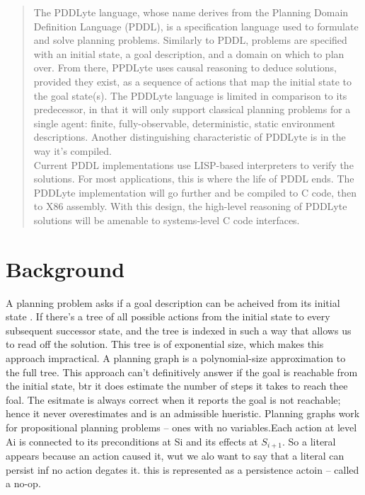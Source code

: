 \documentclass[
a4paper, %
11pt, %
onecolumn, %
openany, %
]{memoir}
\begin{document}
\begin{abstract}
The PDDLyte language, whose name derives from the Planning Domain Definition Language (PDDL)\cite{pddl98}, is a specification language used to formulate and solve planning problems. Similarly to PDDL, problems are specified with an initial state, a goal description, and a domain on which to plan over. From there, PPDLyte uses causal reasoning to deduce solutions, provided they exist, as a sequence of actions that map the initial state to the goal state(s). The PDDLyte language is limited in comparison to its predecessor, in that it will only support classical planning problems for a single agent: finite, fully-observable, deterministic, static environment descriptions. Another distinguishing characteristic of PDDLyte is in the way it's compiled.\\

Current PDDL implementations use LISP-based interpreters to verify the solutions. For most applications, this is where the life of PDDL ends. The PDDLyte implementation will go further and be compiled to C code, then to X86 assembly. With this design, the high-level reasoning of PDDLyte solutions will be amenable to systems-level C code interfaces.
\end{abstract}



\section{Background}

A planning problem asks if a goal description can be acheived from its initial state \cite{ai_rn}. If there's a tree of all possible actions from the initial state to every subsequent successor state, and the tree is indexed in such a way that allows us to read off the solution. This tree is of exponential size, which makes this approach impractical. A planning graph is a polynomial-size approximation to the full tree. This approach can't definitively answer if the goal is reachable from the initial state, btr it does estimate the number of steps it takes to reach thee foal. The esitmate is always correct when it reports the goal is not reachable; hence it never overestimates and is an admissible hueristic. Planning graphs work for propositional planning problems -- ones with no variables.Each action at level Ai is connected to its preconditions at Si and its effects at $S_{i+1}$. So a literal appears because an action caused it, wut we alo want to say that a literal can persist inf no action degates it. this is represented as a persistence actoin -- called a no-op.\\
\end{document}
